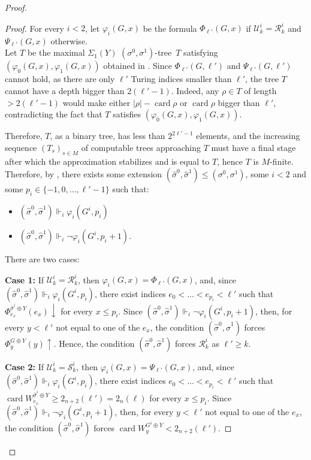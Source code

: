 \documentclass{article}
\def\R{\mathcal{R}}
\def\S{\mathcal{S}}
\newcommand{\card}{\operatorname{card}}
\numberwithin{theorem}{section}
\begin{document}
\begin{proof}
\begin{proof}
For every $i < 2$, let $\varphi_i(G,x)$ be the formula $\Phi_{\ell'}(G,x)$ if $\mathcal{U}^i_k = \R^i_k$ and $\Psi_{\ell'}(G,x)$ otherwise. \\

Let $T$ be the maximal $\Sigma_1(Y)$ $(\sigma^0, \sigma^1)$-tree~$T$ satisfying $(\varphi_0(G, x), \varphi_1(G,x))$ obtained in . Since $\Phi_{\ell'}(G,\ell')$ and $\Psi_{\ell'}(G,\ell')$ cannot hold, as there are only $\ell'$ Turing indices smaller than $\ell'$, the tree $T$ cannot have a depth bigger than $2(\ell'-1)$. Indeed, any $\rho \in T$ of length $> 2(\ell'-1)$ would make either $|\rho| - \card \rho$ or $\card \rho$ bigger than $\ell'$, contradicting the fact that $T$ satisfies $(\varphi_0(G, x), \varphi_1(G,x))$.

Therefore, $T$, as a binary tree, has less than $2^{2\ell' - 1}$ elements, and the increasing sequence $(T_s)_{s \in M}$ of computable trees approaching $T$ must have a final stage after which the approximation stabilizes and is equal to $T$, hence $T$ is $M$-finite. \\

Therefore, by , there exists some extension $(\hat \sigma^0, \hat \sigma^1) \leq (\sigma^0, \sigma^1)$, some $i < 2$ and some $p_i \in \{-1,0, \dots,\ell'-1\}$  such that:
\begin{itemize}
    \item $(\hat \sigma^0, \hat \sigma^1) \Vdash_i \varphi_i(G^i, p_i)$
    \item $(\hat \sigma^0, \hat \sigma^1) \Vdash_i \neg \varphi_i(G^i,p_i + 1)$.
\end{itemize}

There are two cases:
\smallskip

\textbf{Case 1:} If $\mathcal{U}^i_k = \R^i_k$, then $\varphi_i(G,x) = \Phi_{\ell'}(G,x)$, and, since $(\hat \sigma^0, \hat \sigma^1) \Vdash_i \varphi_i(G^i, p_i)$, there exist indices $e_0 < \dots < e_{p_i} < \ell'$ such that $\Phi_{e_x}^{\hat \sigma^i \oplus Y}(e_x) \downarrow$ for every $x \leq p_i$. Since $(\hat \sigma^0, \hat \sigma^1) \Vdash_i \neg \varphi_i(G^i, p_i + 1)$, then, for every $y < \ell'$ not equal to one of the $e_x$, the condition $(\hat \sigma^0, \hat \sigma^1)$ forces $\Phi_{y}^{G \oplus Y}(y) \uparrow$. 
Hence, the condition $(\hat \sigma^0, \hat \sigma^1)$ forces $\R^i_k$ as $\ell' \geq k$.
\smallskip

\textbf{Case 2:} If $\mathcal{U}^i_k = \S^i_k$, then $\varphi_i(G,x) = \Psi_{\ell'}(G,x)$, and, since $(\hat \sigma^0, \hat \sigma^1) \Vdash_i \varphi_i(G^i, p_i)$, there exist indices $e_0 < \dots < e_{p_i} < \ell'$ such that $\card W_{e_x}^{\hat \sigma^i \oplus Y} \geq 2_{n+2}(\ell') = 2_n(\ell)$ for every $x \leq p_i$. Since $(\hat \sigma^0, \hat \sigma^1) \Vdash_i \neg \varphi_i(G^i, p_i + 1)$, then, for every $y < \ell'$ not equal to one of the $e_x$, the condition $(\hat \sigma^0, \hat \sigma^1)$ forces $\card W_{y}^{G^i \oplus Y} < 2_{n+2}(\ell')$.


\end{proof}
\end{proof}
\end{document}
